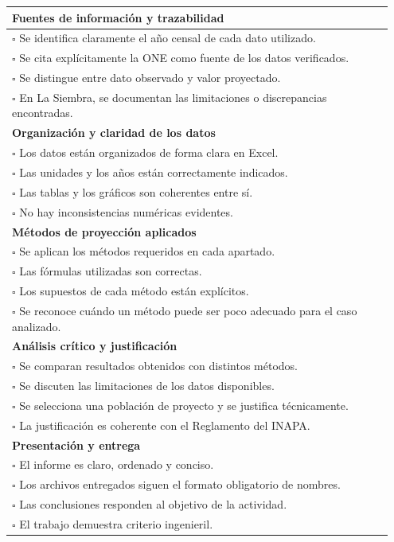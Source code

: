 \documentclass[11pt]{scrartcl}
\begin{document}
\begin{longtable}{p{0.95\linewidth}}
  \toprule
  \textbf{Fuentes de información y trazabilidad} \\
  \midrule
  $\square$ Se identifica claramente el año censal de cada dato
    utilizado. \\
  $\square$ Se cita explícitamente la ONE como fuente de los datos
    verificados. \\
  $\square$ Se distingue entre dato observado y valor proyectado. \\
  $\square$ En La Siembra, se documentan las limitaciones o
    discrepancias encontradas. \\
  \midrule
  \textbf{Organización y claridad de los datos} \\
  \midrule
  $\square$ Los datos están organizados de forma clara en Excel. \\
  $\square$ Las unidades y los años están correctamente indicados. \\
  $\square$ Las tablas y los gráficos son coherentes entre sí. \\
  $\square$ No hay inconsistencias numéricas evidentes. \\
  \midrule
  \textbf{Métodos de proyección aplicados} \\
  \midrule
  $\square$ Se aplican los métodos requeridos en cada apartado. \\
  $\square$ Las fórmulas utilizadas son correctas. \\
  $\square$ Los supuestos de cada método están explícitos. \\
  $\square$ Se reconoce cuándo un método puede ser poco adecuado para
    el caso analizado. \\
  \midrule
  \textbf{Análisis crítico y justificación} \\
  \midrule
  $\square$ Se comparan resultados obtenidos con distintos métodos. \\
  $\square$ Se discuten las limitaciones de los datos disponibles. \\
  $\square$ Se selecciona una población de proyecto y se justifica
    técnicamente. \\
  $\square$ La justificación es coherente con el Reglamento del
    INAPA. \\
  \midrule
  \textbf{Presentación y entrega} \\
  \midrule
  $\square$ El informe es claro, ordenado y conciso. \\
  $\square$ Los archivos entregados siguen el formato obligatorio de
    nombres. \\
  $\square$ Las conclusiones responden al objetivo de la actividad. \\
  $\square$ El trabajo demuestra criterio ingenieril. \\
  \bottomrule
\end{longtable}
\end{document}
